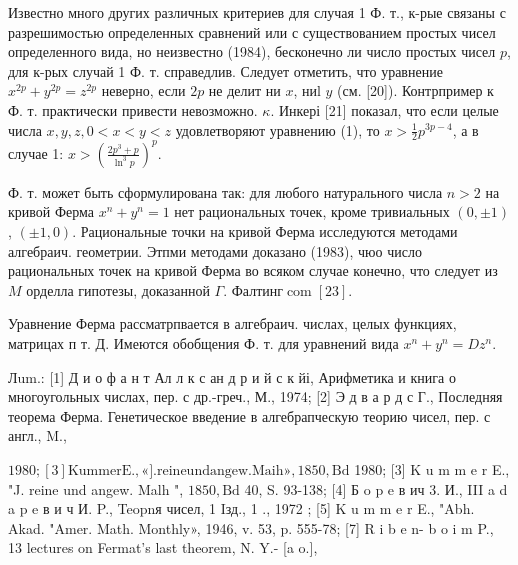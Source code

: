 \documentclass[10pt]{article}
\begin{document}
Известно много других различных критериев для случая 1 Ф. т., к-рые связаны с разрешимостью определенных сравнений или с существованием простых чисел определенного вида, но неизвестно (1984), бесконечно ли число простых чисел $p$, для к-рых случай 1 Ф. т. справедлив. Следует отметить, что уравнение $x^{2 p}+y^{2 p}=z^{2 p}$ неверно, если $2 p$ не делит ни $x$, ниl $y$ (см. [20]). Контрпример к Ф. т. практически привести невозможно. $\kappa$. Инкері [21] показал, что если целые числа $x, y, z, 0<x<y<z$ удовлетворяют уравнению (1), то $x>\frac{1}{2} p^{3 p-4}$, а в случае 1: $x>\left(\frac{2 p^{3}+p}{\ln ^{3} p}\right)^{p}$.



Ф. т. может быть сформулирована так: для любого натурального числа $n>2$ на кривой Ферма $x^{n}+y^{n}=1$ нет рациональных точек, кроме тривиальных $(0, \pm 1)$, $( \pm 1,0)$. Рациональные точки на кривой Ферма исследуются методами алгебраич. геометрии. Этпми методами доказано (1983), чюо число рациональных точек на кривой Ферма во всяком случае конечно, что следует из $M$ орделла гипотезы, доказанной $\Gamma$. Фалтинг$\operatorname{com}[23]$.



Уравнение Ферма рассматрпвается в алгебраич. числах, целых функциях, матрицах п т. Д. Имеются обобщения $Ф$. т. для уравнений вида $x^{n}+y^{n}=D z^{n}$.



Лum.: [1] Д и о ф а н т Ал л к с ан д р и й с к йі, Арифметика и книга о многоугольных числах, пер. с др.-греч., М., 1974; [2] Э д в а р д с Г., Последняя теорема Ферма. Генетическое введение в алгебрапческую теорию чисел, пер. с англ., M.,

$1980 ;[3] \mathrm{K} \mathrm{u} \mathrm{m} \mathrm{m} \mathrm{e} \mathrm{r} \mathrm{E.,} \mathrm{«].} \mathrm{reine} \mathrm{und} \mathrm{angew.} \mathrm{Maih} \mathrm{»,} \mathrm{1850,} \mathrm{Bd}$ 1980; [3] K u m m e r E., "J. reine und angew. Malh ", $1850, \mathrm{Bd}$ 40, S. 93-138; [4] Б o p e в ич 3. И., III a d a p e в и ч И. P., Teopnя чисел, 1 Iзд., 1 ., 1972 ; [5] $\mathrm{K}$ u $\mathrm{m}$ m e r E., "Abh. Akad. "Amer. Math. Monthly», 1946, v. 53, p. 555-78; [7] R i b e n- b o i m P., 13 lectures on Fermat's last theorem, N. Y.- [a o.],
\end{document}
